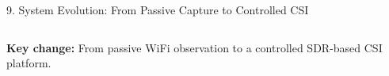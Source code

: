 \documentclass[aspectratio=169,11pt]{beamer}
\begin{document}
\begin{frame}{9. System Evolution: From Passive Capture to Controlled CSI}
\begin{columns}[T,totalwidth=\textwidth]

\end{columns}

\vspace{0.35cm}

\begin{center}
\textbf{\color{AmritaMaroon}Key change:}
From passive WiFi observation to a controlled SDR-based CSI platform.
\end{center}

\end{frame}


\end{document}

